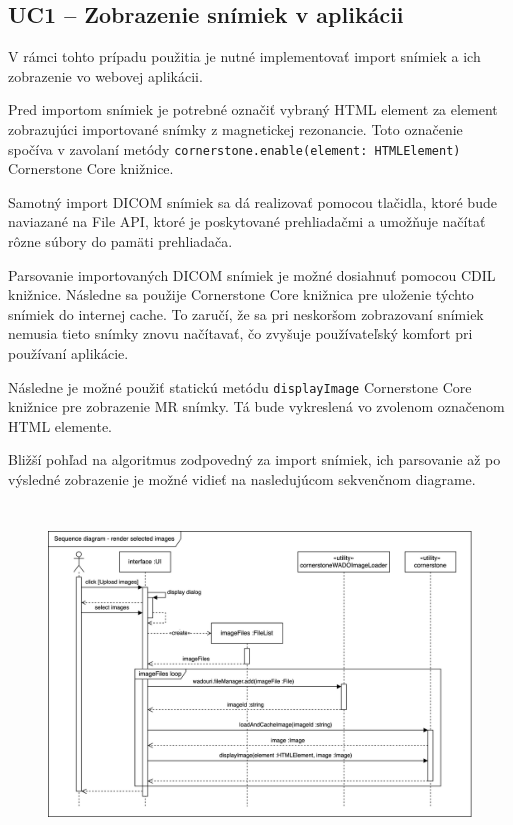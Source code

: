 \subsection {UC1 -- Zobrazenie snímiek v aplikácii}
V rámci tohto prípadu použitia je nutné implementovať import snímiek a ich zobrazenie vo webovej aplikácii.

Pred importom snímiek je potrebné označiť vybraný HTML element za element zobrazujúci importované snímky z magnetickej rezonancie. Toto označenie spočíva v zavolaní metódy \texttt{cornerstone.enable(element: HTMLElement)} Cornerstone Core knižnice.

Samotný import DICOM snímiek sa dá realizovať pomocou tlačidla, ktoré bude naviazané na File API, ktoré je poskytované prehliadačmi a umožňuje načítať rôzne súbory do pamäti prehliadača.

Parsovanie importovaných DICOM snímiek je možné dosiahnuť pomocou CDIL knižnice. Následne sa použije Cornerstone Core knižnica pre uloženie týchto snímiek do internej cache. To zaručí, že sa pri neskoršom zobrazovaní snímiek nemusia tieto snímky znovu načítavať, čo zvyšuje používateľský komfort pri používaní aplikácie.

Následne je možné použiť statickú metódu \texttt{displayImage} Cornerstone Core knižnice pre zobrazenie MR snímky. Tá bude vykreslená vo zvolenom označenom HTML elemente.

Bližší pohľad na algoritmus zodpovedný za import snímiek, ich parsovanie až po výsledné zobrazenie je možné vidieť na nasledujúcom sekvenčnom diagrame.

\begin {figure}[H]
        \centering
        \includegraphics[height=9cm]{media/graphs/render_images.png}
        \captionsetup{justification=centering}
\end {figure}

